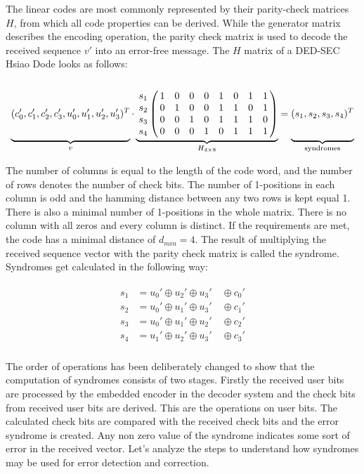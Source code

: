 The linear codes are most commonly represented by their parity-check matrices $H$, from which all code properties can be derived. While the generator matrix describes the encoding operation, the parity check matrix is used to decode the received sequence $v'$ into an error-free message. The $H$ matrix of a DED-SEC Hsiao Dode looks as follows:
\begin{equation*}
\underbrace{
\vphantom{\bordermatrix{&&&&&&&&\cr &1&0&0&0&1&1&1&0\cr&0&1&0&0&0&1&1&1\cr&0&0&1&0&1&0&1&1\cr&0&0&0&1&1&1&0&1\cr}
}(c_0',c_1',c_2',c_3',u_0',u_1',u_2',u_3')^T}_{v}
\cdot \underbrace{\bordermatrix{
&&&&&&&&\cr 
 s_1 &1& 0 & 0 & 0 &1&0&1&1 \cr 
 s_2 &0& 1 & 0 & 0 &1&1&0&1 \cr 
 s_3 &0& 0 & 1 & 0 &1&1&1&0\cr 
 s_4 &0& 0 & 0 & 1 &0&1&1&1
}}_{H_{4\times 8}} = 
\underbrace{
\vphantom{\bordermatrix{&&&&&&&&\cr &1&0&0&0&1&1&1&0\cr&0&1&0&0&0&1&1&1\cr&0&0&1&0&1&0&1&1\cr&0&0&0&1&1&1&0&1\cr}
}(s_1,s_2,s_3,s_4)^T}_{\text{syndromes}}
\end{equation*}

The number of columns is equal to the length of the code word, and the number of rows denotes the number of check bits. The number of 1-positions in each column is odd and the hamming distance between any two rows is kept equal 1. There is also a minimal number of 1-positions in the whole matrix. There is no column with all zeros and every column is distinct. If the requirements are met, the code has a minimal distance of $d_{min} = 4$. The result of multiplying the received sequence vector with the parity check matrix is called the syndrome. Syndromes get calculated in the following way:

\begin{align}
\begin{aligned}
s_1 &= u_0' \oplus u_2' \oplus u_3' \quad\oplus c_0' \\
s_2 &= u_0' \oplus u_1' \oplus u_3' \quad\oplus c_1' \\
s_3 &= u_0' \oplus u_1' \oplus u_2' \quad\oplus c_2' \\
s_4 &= u_1'\oplus u_2' \oplus u_3' \quad\oplus c_3' \\
\end{aligned}
\end{align}

The order of operations has been deliberately changed to show that the computation of syndromes consists of two stages. Firstly the received user bits are processed by the embedded encoder in the decoder system and the check bits from received user bits are derived. This are the operations on user bits. The calculated check bits are compared with the received check bits and the error syndrome is created. Any non zero value of the syndrome indicates some sort of error in the received vector. Let's analyze the steps to understand how syndromes may be used for error detection and correction. 

